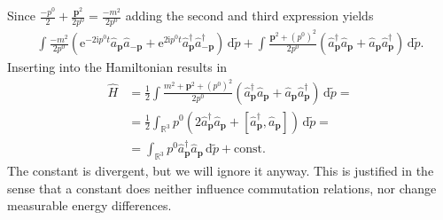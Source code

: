 \documentclass[english, parskip=full]{scrartcl}
\newcommand{\intx}{}
\newcommand{\intr}{}
\newcommand{\kla}{}
\newcommand{\klam}{}
\newcommand{\tecxt}{}
\renewcommand{\i}{\text{i}}
\newcommand{\e}{\text{e}}
\begin{document}
Since $\frac{-p^0}{2} + \frac{\textbf{p}^2}{2p^0} = \frac{-m^2}{2p^0}$ adding the second and third expression yields
\begin{align}
\int \frac{-m^2}{2p^0} \left( \e^{-2\i p^0t} \hat{a}_\textbf{p} \hat{a}_{-\textbf{p}} + \e^{2\i p^0 t} \hat{a}_\textbf{p}^\dagger \hat{a}_{-\textbf{p}}^\dagger \right)\, \mathrm{d}\tilde{p} + \intx\int_{ }^{ } \frac{\textbf{p}^2 + (p^0)^2}{2p^0} \left(  \hat{a}_\textbf{p}^\dagger \hat{a}_\textbf{p} + \hat{a}_\textbf{p} \hat{a}_\textbf{p}^\dagger \right) \, \mathrm{d}\tilde{p}.
\end{align}
Inserting into the Hamiltonian results in
\begin{align}
\hat{H} &= \frac{1}{2} \int \frac{m^2 + \textbf{p}^2 + (p^0)^2}{2p^0} \left( \hat{a}_\textbf{p}^\dagger \hat{a}_\textbf{p} + \hat{a}_\textbf{p} \hat{a}_\textbf{p}^\dagger \right) \,\mathrm{d}\tilde{p} = \\
&= \frac{1}{2} \int_{\mathbb{R}^{3}} p^0 \kla\left( 2\hat{a}_\textbf{p}^\dagger \hat{a}_\textbf{p} + \klam\left[ \hat{a}_\textbf{p}^\dagger,  \hat{a}_\textbf{p} \right] \right) \, \mathrm{d}\tilde{p} = \\
&= \intr\int_{\mathbb{R}^{3}} p^0 \hat{a}_\textbf{p}^\dagger \hat{a}_\textbf{p} \, \mathrm{d}\tilde{p} + \tecxt\text{const.}
\end{align} %
The constant is divergent, but we will ignore it anyway.
This is justified in the sense that a constant does neither influence commutation relations, nor change measurable energy differences.
\end{document}
